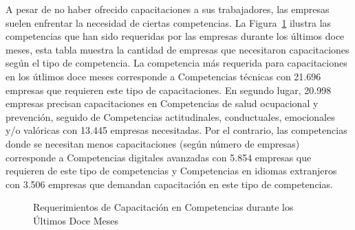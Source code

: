 \documentclass[
  11pt,
]{article}
\begin{document}
\newpage

A pesar de no haber ofrecido capacitaciones a sus trabajadores, las
empresas suelen enfrentar la necesidad de ciertas competencias. La
Figura~\ref{fig-competencias_necesarias} ilustra las competencias que
han sido requeridas por las empresas durante los últimos doce meses,
esta tabla muestra la cantidad de empresas que necesitaron
capacitaciones según el tipo de competencia. La competencia más
requerida para capacitaciones en los útlimos doce meses corresponde a
Competencias técnicas con 21.696 empresas que requieren este tipo de
capacitaciones. En segundo lugar, 20.998 empresas precisan
capacitaciones en Competencias de salud ocupacional y prevención,
seguido de Competencias actitudinales, conductuales, emocionales y/o
valóricas con 13.445 empresas necesitadas. Por el contrario, las
competencias donde se necesitan menos capacitaciones (según número de
empresas) corresponde a Competencias digitales avanzadas con 5.854
empresas que requieren de este tipo de competencias y Competencias en
idiomas extranjeros con 3.506 empresas que demandan capacitación en este
tipo de competencias.

\begin{figure}[H]

\caption{\label{fig-competencias_necesarias}Requerimientos de
Capacitación en Competencias durante los Últimos Doce Meses}


\end{figure}%
\end{document}
